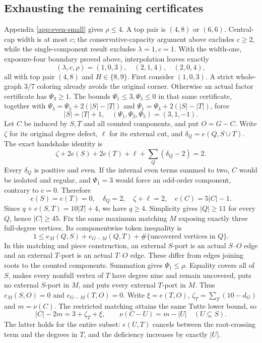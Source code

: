 \documentclass[11pt,a4paper]{article}
\theoremstyle{definition}
\begin{document}
\subsection{Exhausting the remaining certificates}
Appendix \ref{app:even-small} gives $\rho\le4$. A top pair is $(4,8)$ or $(6,6)$. Central-cap width is at most $c$; the conservative-capacity argument above excludes $c\ge2$, while the single-component result excludes $\lambda=1,c=1$. With the width-one, exposure-four boundary proved above, interpolation leaves exactly
\[
(\lambda,c,\rho)=(1,0,3),\quad(2,1,4),\quad(2,0,4),
\]
all with top pair $(4,8)$ and $H\in\{8,9\}$.
First consider $(1,0,3)$. A strict whole-graph $3/7$ coloring already avoids the original corner. Otherwise an actual factor certificate has $\Psi_3\ge1$. The bounds $\Psi_1\le3,\Psi_5\le0$ in that same certificate, together with
$\Psi_3=\Psi_5+2(|S|-|T|)$ and $\Psi_1=\Psi_3+2(|S|-|T|)$, force
\[
 |S|=|T|+1,\quad(\Psi_1,\Psi_3,\Psi_5)=(3,1,-1).
\]
Let $C$ be induced by $S,T$ and all counted components, and put $O=G-C$. Write $\zeta$ for its original degree defect, $\ell$ for its external cut, and $\delta_Q=e(Q,S\cup T)$. The exact handshake identity is
\[
 \zeta+2e(S)+2e(T)+\ell+\sum_Q(\delta_Q-2)=2.
\]
Every $\delta_Q$ is positive and even. If the internal even terms summed to two, $C$ would be isolated and regular, and $\Psi_1=3$ would force an odd-order component, contrary to $c=0$. Therefore
\[
 e(S)=e(T)=0,\quad\delta_Q=2,\quad\zeta+\ell=2,\quad e(C)=5|C|-1.
\]
Since $q+e(S,T)=10|T|+4$, we have $q\ge4$. Simplicity gives $|Q|\ge11$ for every $Q$, hence $|C|\ge45$.
Fix the same maximum matching $M$ exposing exactly three full-degree vertices. Its componentwise token inequality is
\[
1\le e_M(Q,S)+e_{G-M}(Q,T)+\#\{\text{uncovered vertices in }Q\}.
\]
In this matching and piece construction, an external $S$-port is an
actual $S$--$O$ edge and an external $T$-port is an actual $T$--$O$ edge.
These differ from edges joining roots to the counted components.
Summation gives $\Psi_1\le\rho$. Equality covers all of $S$, makes every nonfull vertex of $T$ have degree nine and remain uncovered, puts no external $S$-port in $M$, and puts every external $T$-port in $M$. Thus $e_M(S,O)=0$ and $e_{G-M}(T,O)=0$. Write $\xi=e(T,O)$, $\zeta_T=\sum_T(10-d_G)$ and $m=\nu(C)$. The restricted matching attains the same Tutte lower bound, so
\[
 |C|-2m=3+\zeta_T+\xi,\qquad \nu(C-U)=m-|U|\quad(U\subseteq S).
\]
The latter holds for the entire subset: $e(U,T)$ cancels between the root-crossing term and the degrees in $T$, and the deficiency increases by exactly $|U|$.
\end{document}
